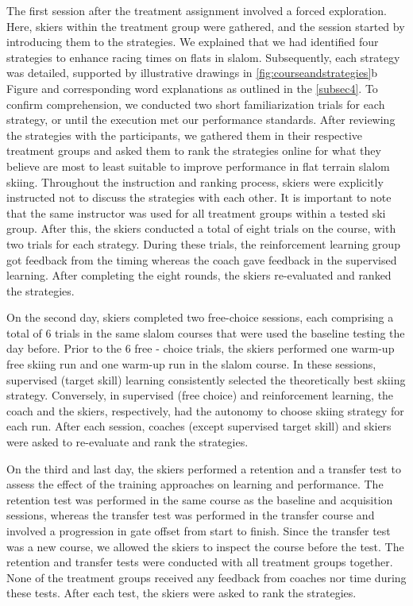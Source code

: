 \documentclass{article}
\begin{document}
The first session after the treatment assignment involved a forced exploration. Here, skiers within the treatment group were gathered, and the session started by introducing them to the strategies. We explained that we had identified four strategies to enhance racing times on flats in slalom. Subsequently, each strategy was detailed, supported by illustrative drawings in \ref{fig:courseandstrategies}b Figure and corresponding word explanations as outlined in the \ref{subsec4}. To confirm comprehension, we conducted two short familiarization trials for each strategy, or until the execution met our performance standards. After reviewing the strategies with the participants, we gathered them in their respective treatment groups and asked them to rank the strategies online for what they believe are most to least suitable to improve performance in flat terrain slalom skiing. Throughout the instruction and ranking process, skiers were explicitly instructed not to discuss the strategies with each other. It is important to note that the same instructor was used for all treatment groups within a tested ski group. After this, the skiers conducted a total of eight trials on the course, with two trials for each strategy. During these trials, the reinforcement learning group got feedback from the timing whereas the coach gave feedback in the supervised learning. After completing the eight rounds, the skiers re-evaluated and ranked the strategies.

On the second day, skiers completed two free-choice sessions, each comprising a total of 6 trials in the same slalom courses that were used the baseline testing the day before. Prior to the 6 free - choice trials, the skiers performed one warm-up free skiing run and one warm-up run in the slalom course. In these sessions, supervised (target skill) learning consistently selected the theoretically best skiing strategy. Conversely, in supervised (free choice) and reinforcement learning, the coach and the skiers, respectively, had the autonomy to choose skiing strategy for each run. After each session, coaches (except supervised target skill) and skiers were asked to re-evaluate and rank the strategies.

On the third and last day, the skiers performed a retention and a transfer test to assess the effect of the training approaches on learning and performance. The retention test was performed in the same course as the baseline and acquisition sessions, whereas the transfer test was performed in the transfer course and involved a progression in gate offset from start to finish. Since the transfer test was a new course, we allowed the skiers to inspect the course before the test. The retention and transfer tests were conducted with all treatment groups together. None of the treatment groups received any feedback from coaches nor time during these tests. After each test, the skiers were asked to rank the strategies. 
\end{document}
